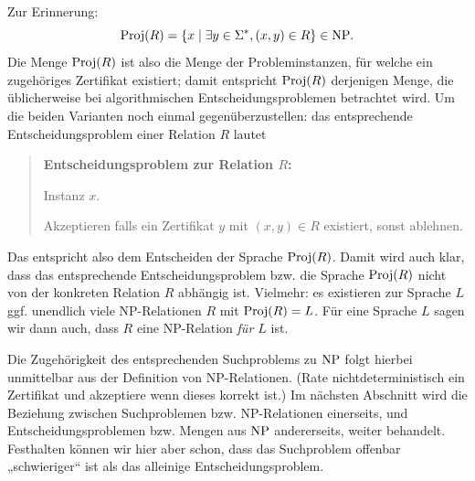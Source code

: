 Zur Erinnerung:
\[ \operatorname{Proj}(R) = \{ x \mid \exists y\in\Sigma^*, (x,y)\in R \}\in\mathrm{NP}. \]
Die Menge $\operatorname{Proj}(R)$ ist also die Menge der Probleminstanzen, für welche ein zugehöriges Zertifikat existiert; damit entspricht $\operatorname{Proj}(R)$ derjenigen Menge, die üblicherweise bei algorithmischen Entscheidungsproblemen betrachtet wird. 
Um die beiden Varianten noch einmal gegenüberzustellen: das entsprechende Entscheidungsproblem einer Relation $R$ lautet
\begin{quote}
    \textbf{Entscheidungsproblem zur Relation $R$:}
    \begin{description}[nosep]
        \item[Gegeben:] Instanz $x$.
        \item[Gesucht:] Akzeptieren falls ein Zertifikat $y$ mit $(x,y)\in  R$ existiert, sonst ablehnen.
    \end{description}
\end{quote}
Das entspricht also dem Entscheiden der Sprache $\operatorname{Proj}(R)$. Damit wird auch klar, dass das entsprechende Entscheidungsproblem bzw. die Sprache $\operatorname{Proj}(R)$ nicht von der konkreten Relation $R$ abhängig ist. Vielmehr: es existieren zur Sprache $L$ ggf. unendlich viele NP-Relationen $R$ mit $\operatorname{Proj}(R)=L$.  Für eine Sprache $L$ sagen wir dann auch, dass $R$ eine NP-Relation \emph{für $L$} ist.

Die Zugehörigkeit des entsprechenden Suchproblems zu $\mathrm{NP}$ folgt hierbei unmittelbar aus der Definition von NP-Relationen. (Rate nichtdeterministisch ein Zertifikat und akzeptiere wenn dieses korrekt ist.)
Im nächsten Abschnitt wird die Beziehung zwischen Suchproblemen bzw. NP-Relationen einerseits, und Entscheidungsproblemen bzw. Mengen aus $\mathrm{NP}$ andererseits, weiter behandelt.
Festhalten können wir hier aber schon, dass das Suchproblem offenbar „schwieriger“ ist als das alleinige Entscheidungsproblem.

